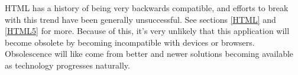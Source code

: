 HTML has a history of being very backwards compatible, and efforts to break with this trend have been generally unsuccessful. 
See sections \ref{HTML} and \ref{HTML5} for more. Because of this, it's very unlikely that this application will become obsolete 
by becoming incompatible with devices or browsers. Obsolescence will like come from better and newer solutions becoming 
available as technology progresses naturally.